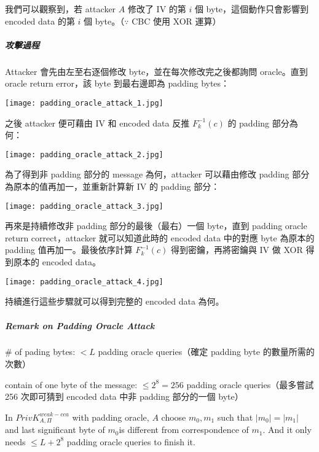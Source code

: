 我們可以觀察到，若 attacker \(A\) 修改了 IV 的第 \(i\) 個 byte，這個動作只會影響到 encoded data 的第 \(i\) 個 byte。（\(\because\) CBC 使用 XOR 運算）

\subparagraph{攻擊過程}

Attacker 會先由左至右逐個修改 byte，並在每次修改完之後都詢問 oracle。直到 oracle return error，該 byte 到最右邊即為 padding bytes：
\begin{center}
	\texttt{[image: padding\_oracle\_attack\_1.jpg]}
\end{center}

之後 attacker 便可藉由 IV 和 encoded data 反推 \(F_k^{-1}(c)\) 的 padding 部分為何：
\begin{center}
	\texttt{[image: padding\_oracle\_attack\_2.jpg]}
\end{center}

為了得到非 padding 部分的 message 為何，attacker 可以藉由修改 padding 部分為原本的值再加一，並重新計算新 IV 的 padding 部分：
\begin{center}
	\texttt{[image: padding\_oracle\_attack\_3.jpg]}
\end{center}

再來是持續修改非 padding 部分的最後（最右）一個 byte，直到 padding oracle return correct，attacker 就可以知道此時的 encoded data 中的對應 byte 為原本的 padding 值再加一。最後依序計算 \(F_k^{-1}(c)\) 得到密鑰，再將密鑰與 IV 做 XOR 得到原本的 encoded data。
\begin{center}
	\texttt{[image: padding\_oracle\_attack\_4.jpg]}
\end{center}

持續進行這些步驟就可以得到完整的 encoded data 為何。

\subparagraph{Remark on Padding Oracle Attack}

\begin{myItemize}
	\item \# of pading bytes: \(< L\) padding oracle queries（確定 padding byte 的數量所需的次數）
	\item contain of one byte of the message: \(\leq 2^8 = 256\) padding oracle queries（最多嘗試 256 次即可猜到 encoded data 中非 padding 部分的一個 byte）
	\item In \(PrivK^{weak-cca}_{A, \Pi}\) with padding oracle, \(A\) choose \(m_0, m_1\) such that \(|m_0| = |m_1|\) and last significant byte of \(m_0\)is different from correspondence of \(m_1\). And it only needs \(\leq L + 2^8\) padding oracle queries to finish it.
\end{myItemize}


